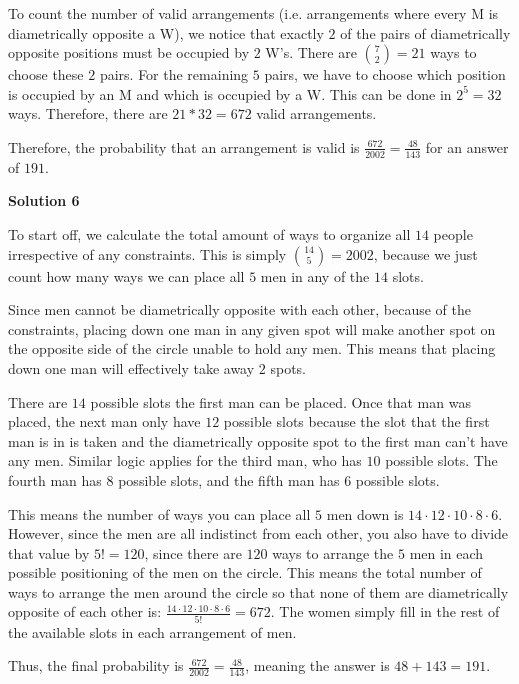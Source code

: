\begin{enumerate}
 To count the number of valid arrangements (i.e. arrangements where every M is diametrically opposite a W), we notice that exactly $2$ of the pairs of diametrically opposite positions must be occupied by $2$ W's. There are $\binom{7}{2} = 21$ ways to choose these $2$ pairs. For the remaining $5$ pairs, we have to choose which position is occupied by an M and which is occupied by a W. This can be done in $2^{5} = 32$ ways. Therefore, there are $21*32 = 672$ valid arrangements. 

 Therefore, the probability that an arrangement is valid is $\frac{672}{2002} = \frac{48}{143}$ for an answer of $\boxed{191}.$




\textbf{Solution 6}

To start off, we calculate the total amount of ways to organize all $14$ people irrespective of any constraints. This is simply ${14\choose5} = 2002$, because we just count how many ways we can place all $5$ men in any of the $14$ slots. 

 Since men cannot be diametrically opposite with each other, because of the constraints, placing down one man in any given spot will make another spot on the opposite side of the circle unable to hold any men. This means that placing down one man will effectively take away $2$ spots. 

 There are $14$ possible slots the first man can be placed. Once that man was placed, the next man only have $12$ possible slots because the slot that the first man is in is taken and the diametrically opposite spot to the first man can't have any men. Similar logic applies for the third man, who has $10$ possible slots. The fourth man has $8$ possible slots, and the fifth man has $6$ possible slots.

 This means the number of ways you can place all $5$ men down is $14 \cdot 12 \cdot 10 \cdot 8 \cdot 6$. However, since the men are all indistinct from each other, you also have to divide that value by $5! = 120$, since there are $120$ ways to arrange the $5$ men in each possible positioning of the men on the circle. This means the total number of ways to arrange the men around the circle so that none of them are diametrically opposite of each other is: $\frac{14 \cdot 12 \cdot 10 \cdot 8 \cdot 6}{5!} = 672$. The women simply fill in the rest of the available slots in each arrangement of men.

 Thus, the final probability is $\frac{672}{2002} = \frac{48}{143}$, meaning the answer is $48 + 143 = \boxed{191}$.


\end{enumerate}

